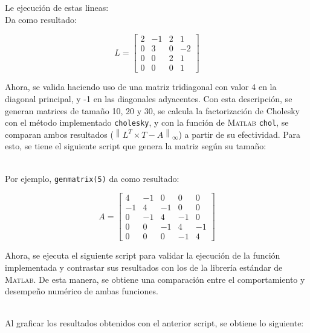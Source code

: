 \documentclass[11pt, spanish]{article}
\newcommand{\norm}[1]{\left\lVert#1\right\rVert}
\begin{document}
\begin{itemize}
Le ejecución de estas lineas:\\



Da como resultado:

$$L = \begin{bmatrix} 2 & -1 & 2 & 1\\ 0 & 3 & 0 & -2\\ 0 & 0 & 2 & 1\\ 0 & 0 & 0 & 1 \end{bmatrix}
$$

Ahora, se valida haciendo uso de una matriz tridiagonal con valor 4 en la diagonal principal, y -1 en las diagonales adyacentes. Con esta descripción, se generan matrices de tamaño 10, 20 y 30, se calcula la factorización de Cholesky con el método implementado \texttt{cholesky}, y con la función de \textsc{Matlab} \texttt{chol}, se comparan ambos resultados ($\norm{L^T \times T -A}_\infty$) a partir de su efectividad. Para esto, se tiene el siguiente script que genera la matriz según su tamaño:\\

\

Por ejemplo, \texttt{genmatrix(5)} da como resultado:\

$$A = \begin{bmatrix}
    4 & -1 & 0 & 0 & 0\\ -1 & 4 & -1 & 0 & 0\\ 0 & -1 & 4 & -1 & 0\\ 0 & 0 & -1 & 4 & -1\\ 0 & 0 & 0 & -1 & 4 
\end{bmatrix}$$

Ahora, se ejecuta el siguiente script para validar la ejecución de la función implementada y contrastar sus resultados con los de la librería estándar de \textsc{Matlab}. De esta manera, se obtiene una comparación entre el comportamiento y desempeño numérico de ambas funciones.\\

\

Al graficar los resultados obtenidos con el anterior script, se obtiene lo siguiente:


\end{itemize}
\end{document}
